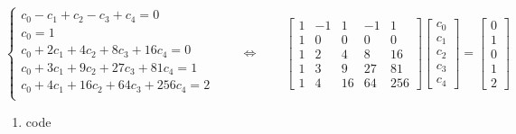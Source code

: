 \documentclass[11pt]{article}
\providecommand{\tightlist}{%
      \setlength{\itemsep}{0pt}\setlength{\parskip}{0pt}}
\begin{document}
\[\left\{\begin{array}{l}
c_0-c_1+c_2-c_3+c_4=0\\
c_0=1\\
c_0+2c_1+4c_2+8c_3+16c_4=0\\
c_0+3c_1+9c_2+27c_3+81c_4=1\\
c_0+4c_1+16c_2+64c_3+256c_4=2\\
\end{array}\right.\qquad
\Leftrightarrow\qquad
\begin{bmatrix}
1&-1&1&-1&1\\
1&0&0&0&0\\
1&2&4&8&16\\
1&3&9&27&81\\
1&4&16&64&256
\end{bmatrix}
\begin{bmatrix}c_0\\c_1\\c_2\\c_3\\c_4\end{bmatrix}=
\begin{bmatrix}0\\1\\0\\1\\2\end{bmatrix}
\]

\begin{enumerate}
\def\labelenumi{(\alph{enumi})}
\setcounter{enumi}{2}
\tightlist
\item
  code
\end{enumerate}
\end{document}
